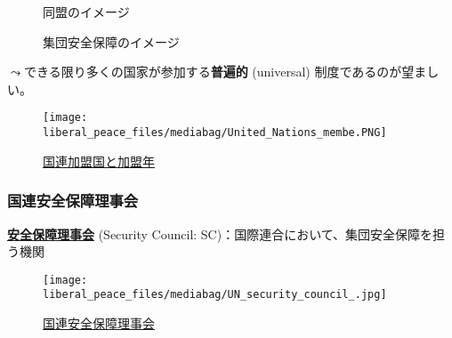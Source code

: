 \documentclass[
  xelatex,
  ja=standard]{bxjsarticle}
\begin{document}
\begin{figure}

\begin{minipage}[t]{0.50\linewidth}

{\centering 


\caption{同盟のイメージ}

}

\end{minipage}%
%
\begin{minipage}[t]{0.50\linewidth}

{\centering 


\caption{集団安全保障のイメージ}

}

\end{minipage}%

\end{figure}

\(\leadsto\)できる限り多くの国家が参加する\textbf{普遍的} (universal)
制度であるのが望ましい。

\begin{figure}[htpb]

{\centering \texttt{[image: liberal\_peace\_files/mediabag/United\_Nations\_membe.PNG]}

}

\caption{\href{https://commons.wikimedia.org/wiki/File:United_Nations_member_countries_world_map.PNG}{国連加盟国と加盟年}}

\end{figure}

\hypertarget{ux56fdux9023ux5b89ux5168ux4fddux969cux7406ux4e8bux4f1a}{%
\subsubsection{国連安全保障理事会}\label{ux56fdux9023ux5b89ux5168ux4fddux969cux7406ux4e8bux4f1a}}

\href{https://www.un.org/securitycouncil/}{\textbf{安全保障理事会}}
(Security Council: SC)：国際連合において、集団安全保障を担う機関

\begin{figure}[htpb]

{\centering \texttt{[image: liberal\_peace\_files/mediabag/UN\_security\_council\_.jpg]}

}

\caption{\href{https://commons.wikimedia.org/wiki/File:UN_security_council_2005.jpg}{国連安全保障理事会}}

\end{figure}
\end{document}
